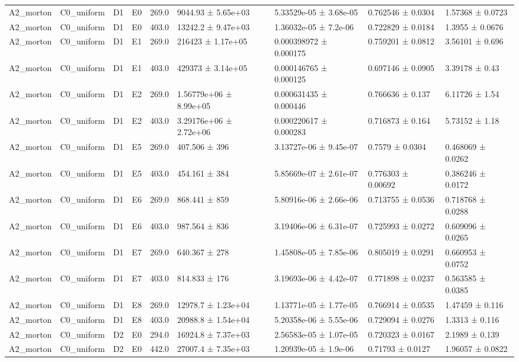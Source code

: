 \begin{table}
\begin{tabular}{lllllllll}
A2\_morton & C0\_uniform & D1 & E0 & 269.0 & 9044.93 ± 5.65e+03 & 5.33529e-05 ± 3.68e-05 & 0.762546 ± 0.0304 & 1.57368 ± 0.0723 \\
A2\_morton & C0\_uniform & D1 & E0 & 403.0 & 13242.2 ± 9.47e+03 & 1.36032e-05 ± 7.2e-06 & 0.722829 ± 0.0184 & 1.3955 ± 0.0676 \\
A2\_morton & C0\_uniform & D1 & E1 & 269.0 & 216423 ± 1.17e+05 & 0.000398972 ± 0.000175 & 0.759201 ± 0.0812 & 3.56101 ± 0.696 \\
A2\_morton & C0\_uniform & D1 & E1 & 403.0 & 429373 ± 3.14e+05 & 0.000146765 ± 0.000125 & 0.697146 ± 0.0905 & 3.39178 ± 0.43 \\
A2\_morton & C0\_uniform & D1 & E2 & 269.0 & 1.56779e+06 ± 8.99e+05 & 0.000631435 ± 0.000446 & 0.766636 ± 0.137 & 6.11726 ± 1.54 \\
A2\_morton & C0\_uniform & D1 & E2 & 403.0 & 3.29176e+06 ± 2.72e+06 & 0.000220617 ± 0.000283 & 0.716873 ± 0.164 & 5.73152 ± 1.18 \\
A2\_morton & C0\_uniform & D1 & E5 & 269.0 & 407.506 ± 396 & 3.13727e-06 ± 9.45e-07 & 0.7579 ± 0.0304 & 0.468069 ± 0.0262 \\
A2\_morton & C0\_uniform & D1 & E5 & 403.0 & 454.161 ± 384 & 5.85669e-07 ± 2.61e-07 & 0.776303 ± 0.00692 & 0.386246 ± 0.0172 \\
A2\_morton & C0\_uniform & D1 & E6 & 269.0 & 868.441 ± 859 & 5.80916e-06 ± 2.66e-06 & 0.713755 ± 0.0536 & 0.718768 ± 0.0288 \\
A2\_morton & C0\_uniform & D1 & E6 & 403.0 & 987.564 ± 836 & 3.19406e-06 ± 6.31e-07 & 0.725993 ± 0.0272 & 0.609096 ± 0.0265 \\
A2\_morton & C0\_uniform & D1 & E7 & 269.0 & 640.367 ± 278 & 1.45808e-05 ± 7.85e-06 & 0.805019 ± 0.0291 & 0.660953 ± 0.0752 \\
A2\_morton & C0\_uniform & D1 & E7 & 403.0 & 814.833 ± 176 & 3.19693e-06 ± 4.42e-07 & 0.771898 ± 0.0237 & 0.563585 ± 0.0385 \\
A2\_morton & C0\_uniform & D1 & E8 & 269.0 & 12978.7 ± 1.23e+04 & 1.13771e-05 ± 1.77e-05 & 0.766914 ± 0.0535 & 1.47459 ± 0.116 \\
A2\_morton & C0\_uniform & D1 & E8 & 403.0 & 20988.8 ± 1.54e+04 & 5.20358e-06 ± 5.55e-06 & 0.729094 ± 0.0276 & 1.3313 ± 0.116 \\
A2\_morton & C0\_uniform & D2 & E0 & 294.0 & 16924.8 ± 7.37e+03 & 2.56583e-05 ± 1.07e-05 & 0.720323 ± 0.0167 & 2.1989 ± 0.139 \\
A2\_morton & C0\_uniform & D2 & E0 & 442.0 & 27007.4 ± 7.35e+03 & 1.20939e-05 ± 1.9e-06 & 0.71793 ± 0.0127 & 1.96057 ± 0.0822 \\

\end{tabular}
\end{table}
